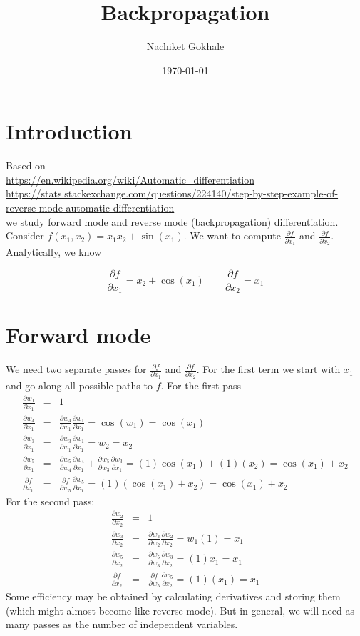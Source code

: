 \documentclass{article}
\newcommand{\beq}{\begin{equation}}
\newcommand{\eeq}{\end{equation}}
\newcommand{\ber}{\begin{eqnarray}}
\newcommand{\eer}{\end{eqnarray}}
\newcommand{\pdd}[2]{\frac{\partial{#1}}{\partial{#2}}}
\begin{document}
\title{Backpropagation}
\author{Nachiket Gokhale}
\date{\today}
\maketitle
\section{Introduction}
Based on\\
\url{https://en.wikipedia.org/wiki/Automatic_differentiation}\\
\url{https://stats.stackexchange.com/questions/224140/step-by-step-example-of-reverse-mode-automatic-differentiation}\\
we study forward mode and reverse mode (backpropagation) differentiation.\\

Consider $f(x_1,x_2)= x_1x_2 + \sin(x_1)$. We want to compute $\pdd{f}{x_1}$ and $\pdd{f}{x_2}$. Analytically, we know

\beq
\pdd{f}{x_1} = x_2 + \cos(x_1) \qquad  \pdd{f}{x_2} = x_1 
\eeq

\section{Forward mode}
We need two separate passes for $\pdd{f}{x_1}$ and $\pdd{f}{x_2}$. For the first term we start with $x_1$ and go along all possible paths to $f$. For the first pass
\ber
\pdd{w_1}{x_1} &=& 1  \\
\pdd{w_4}{x_1} &=& \pdd{w_4}{w_1}\pdd{w_1}{x_1} = \cos(w_1) = \cos(x_1) \\
\pdd{w_3}{x_1} &=& \pdd{w_3}{w_1}\pdd{w_1}{x_1} = w_2 = x_2 \\
\pdd{w_5}{x_1} &=& \pdd{w_5}{w_4}\pdd{w_4}{x_1} + \pdd{w_5}{w_3}\pdd{w_3}{x_1} = (1)\cos(x_1) + (1)(x_2) = \cos(x_1) + x_2\\
\pdd{f}{x_1} &=&  \pdd{f}{w_5}\pdd{w_5}{x_1} = (1)(\cos(x_1) + x_2) = \cos(x_1) + x_2
\eer
For the second pass:
\ber
\pdd{w_2}{x_2} &=& 1 \\
\pdd{w_3}{x_2} &=& \pdd{w_3}{w_2}\pdd{w_2}{x_2} = w_1(1) = x_1 \\
\pdd{w_5}{x_2} &=& \pdd{w_5}{w_3}\pdd{w_3}{x_2} = (1)x_1 = x_1 \\
\pdd{f}{x_2} &=& \pdd{f}{w_5}\pdd{w_5}{x_2} = (1)(x_1) = x_1
\eer
Some efficiency may be obtained by calculating derivatives and storing them (which might almost become like reverse mode). But in general, we will need as many passes as the number of independent variables. 
\end{document}
